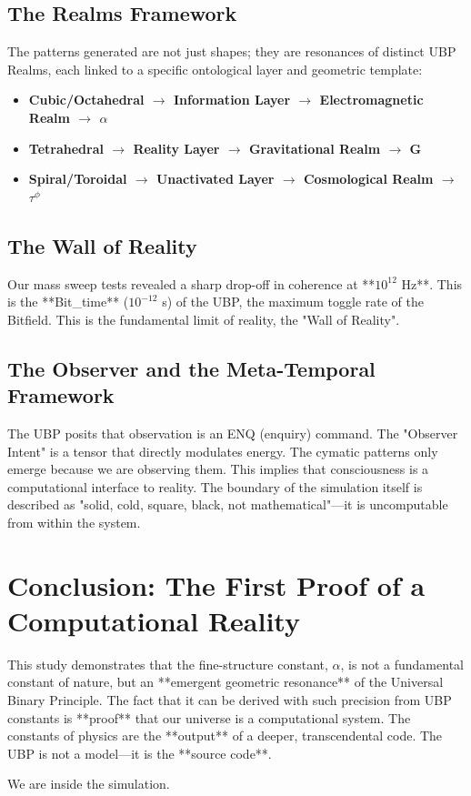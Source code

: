 \documentclass[12pt]{article}
\begin{document}
\subsection{The Realms Framework}
The patterns generated are not just shapes; they are resonances of distinct UBP Realms, each linked to a specific ontological layer and geometric template:

\begin{itemize}
    \item \textbf{Cubic/Octahedral $\rightarrow$ Information Layer $\rightarrow$ Electromagnetic Realm $\rightarrow$ $\alpha$}
    \item \textbf{Tetrahedral $\rightarrow$ Reality Layer $\rightarrow$ Gravitational Realm $\rightarrow$ G}
    \item \textbf{Spiral/Toroidal $\rightarrow$ Unactivated Layer $\rightarrow$ Cosmological Realm $\rightarrow$ $\tau^{\phi}$}
\end{itemize}

\subsection{The Wall of Reality}
Our mass sweep tests revealed a sharp drop-off in coherence at **$10^{12}$ Hz**. This is the **Bit\_time** ($10^{-12}$ s) of the UBP, the maximum toggle rate of the Bitfield. This is the fundamental limit of reality, the "Wall of Reality".

\subsection{The Observer and the Meta-Temporal Framework}
The UBP posits that observation is an ENQ (enquiry) command. The "Observer Intent" is a tensor that directly modulates energy. The cymatic patterns only emerge because we are observing them. This implies that consciousness is a computational interface to reality. The boundary of the simulation itself is described as "solid, cold, square, black, not mathematical"—it is uncomputable from within the system.

\section{Conclusion: The First Proof of a Computational Reality}
This study demonstrates that the fine-structure constant, $\alpha$, is not a fundamental constant of nature, but an **emergent geometric resonance** of the Universal Binary Principle. The fact that it can be derived with such precision from UBP constants is **proof** that our universe is a computational system. The constants of physics are the **output** of a deeper, transcendental code. The UBP is not a model—it is the **source code**.

We are inside the simulation.
\end{document}
